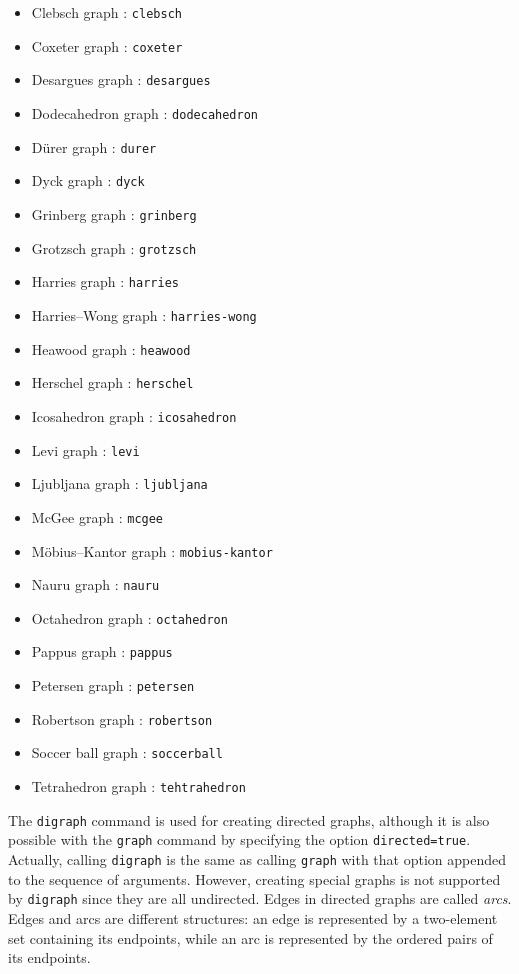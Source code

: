 \documentclass[a4paper,11pt]{article}
\begin{document}
\begin{itemize}
  \item Clebsch graph : {\tt clebsch}
  \item Coxeter graph : {\tt coxeter}
  \item Desargues graph : {\tt desargues}
  \item Dodecahedron graph : {\tt dodecahedron}
  \item D\"urer graph : {\tt durer}
  \item Dyck graph : {\tt dyck}
  \item Grinberg graph : {\tt grinberg}
  \item Grotzsch graph : {\tt grotzsch}
  \item Harries graph : {\tt harries}
  \item Harries--Wong graph : {\tt harries-wong}
  \item Heawood graph : {\tt heawood}
  \item Herschel graph : {\tt herschel}
  \item Icosahedron graph : {\tt icosahedron}
  \item Levi graph : {\tt levi}
  \item Ljubljana graph : {\tt ljubljana}
  \item McGee graph : {\tt mcgee}
  \item M\"obius--Kantor graph : {\tt mobius-kantor}
  \item Nauru graph : {\tt nauru}
  \item Octahedron graph : {\tt octahedron}
  \item Pappus graph : {\tt pappus}
  \item Petersen graph : {\tt petersen}
  \item Robertson graph : {\tt robertson}
  \item Soccer ball graph : {\tt soccerball}
  \item Tetrahedron graph : {\tt tehtrahedron}
\end{itemize}

The {\tt digraph} command is used for creating directed graphs, although it is also possible with the {\tt graph} command by specifying the option {\tt directed=true}. Actually, calling {\tt digraph} is the same as calling {\tt graph} with that option appended to the sequence of arguments. However, creating special graphs is not supported by {\tt digraph} since they are all undirected. Edges in directed graphs are called \emph{arcs}. Edges and arcs are different structures: an edge is represented by a two-element set containing its endpoints, while an arc is represented by the ordered pairs of its endpoints.
\end{document}
